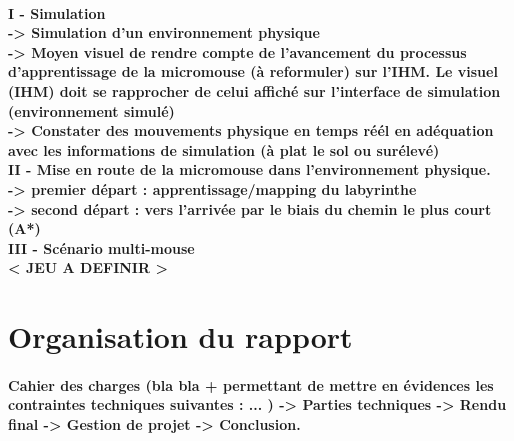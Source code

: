 \paragraph{
I - Simulation
\\ -> Simulation d'un environnement physique
\\ -> Moyen visuel de rendre compte de l'avancement du processus d'apprentissage de la micromouse (à reformuler) sur l'IHM. Le visuel (IHM) doit se rapprocher de celui affiché sur l'interface de simulation (environnement simulé)
\\ -> Constater des mouvements physique en temps réél en adéquation avec les informations de simulation (à plat le sol ou surélevé)
\\II - Mise en route de la micromouse dans l'environnement physique.
\\ -> premier départ : apprentissage/mapping du labyrinthe
\\ -> second départ : vers l'arrivée par le biais du chemin le plus court (A*)
\\ III - Scénario multi-mouse
\\ < JEU A DEFINIR >
}

\section{Organisation du rapport} \label{sec:organisation}

\paragraph{
Cahier des charges (bla bla + permettant de mettre en évidences les contraintes techniques suivantes : ... ) -> Parties techniques -> Rendu final -> Gestion de projet -> Conclusion.
}
